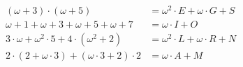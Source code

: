 \begin{align*}
  (\omega+3)\cdot(\omega+5)&=\omega^2\cdot E+\omega\cdot G+S \\
  \omega+1+\omega+3+\omega+5+\omega+7&=\omega\cdot I+O \\
  3\cdot\omega+\omega^2\cdot 5+4\cdot(\omega^2+2)&=
        \omega^2\cdot L+\omega\cdot R+N \\
  2\cdot(2+\omega\cdot3)+(\omega\cdot3+2)\cdot2&=
        \omega\cdot A+M
\end{align*}


